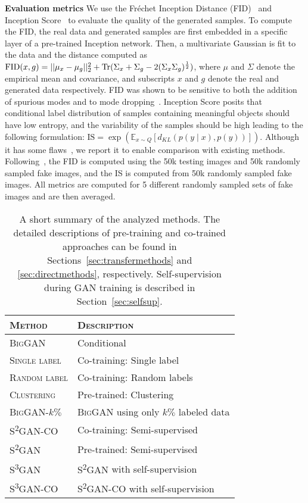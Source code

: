 \documentclass{article}
\newcommand{\E}{\mathbb{E}}
\DeclareMathOperator{\Tr}{Tr}
\newcommand{\cotrainSS}{\textsc{S\textsuperscript{2}GAN-CO}}
\newcommand{\cotrainSSS}{\textsc{S\textsuperscript{3}GAN-CO}}
\newcommand{\tranSS}{\textsc{S\textsuperscript{2}GAN}}
\newcommand{\tranSSS}{\textsc{S\textsuperscript{3}GAN}}
\newcommand{\tranC}{\textsc{Clustering}}
\newcommand{\slabels}{\textsc{Single label}}
\newcommand{\rlabels}{\textsc{Random label}}
\newcommand{\biggan}{\textsc{BigGAN}}
\begin{document}
\textbf{Evaluation metrics} \quad
We use the Fr{\'e}chet Inception Distance (FID)~\citep{heusel2017gans} and Inception Score~\citep{salimans2016improved} to evaluate the quality of the generated samples. To compute the FID, the real data and generated samples are first embedded in a specific layer of a pre-trained Inception network. Then, a multivariate Gaussian is fit to the data and the distance computed as
$\FID(x, g) = ||\mu_x -\mu_g||_2^2 + \Tr(\Sigma_x + \Sigma_g - 2(\Sigma_x\Sigma_g)^\frac12)$,
where $\mu$ and $\Sigma$ denote the empirical mean and covariance, and subscripts $x$ and $g$ denote the real and generated data respectively. FID was shown to be sensitive to both the addition of spurious modes and to mode dropping~\citep{sajjadi2018assessing,lucic2018}. Inception Score posits that conditional label distribution of samples containing meaningful objects should have low entropy, and the variability of the samples should be
high leading to the following formulation: $\text{IS} = \exp(\E_{x \sim Q}[d_{KL}(p(y
\mid x), p(y))])$. Although it has some flaws~\citep{barratt2018note}, we report it to enable comparison with existing methods. Following~\citet{brock2018large}, the FID is computed using the 50k \imagenet{} testing images and 50k randomly sampled fake images, and the IS is computed from 50k randomly sampled fake images. All metrics are computed for 5 different randomly sampled sets of fake images and are then averaged.

\begin{table}[t]
  \centering
  \caption{A short summary of the analyzed methods. The detailed descriptions of pre-training and co-trained approaches can be found in Sections~\ref{sec:transfermethods} and \ref{sec:directmethods}, respectively. Self-supervision during GAN training is described in Section~\ref{sec:selfsup}.\vspace{0.2cm}}
\begin{tabular}{ll}
\toprule
  \textsc{Method} & \textsc{Description} \\\midrule
  \biggan         & Conditional \citep{brock2018large} \\\midrule
  \slabels        & Co-training: Single label\\
  \rlabels        & Co-training: Random labels\\
  \tranC{}        & Pre-trained: Clustering\\\midrule
  \biggan-$k\%$    & \biggan{} using only $k\%$ labeled data \\
  \cotrainSS{}    & Co-training: Semi-supervised\\
  \tranSS{}       & Pre-trained: Semi-supervised\\\midrule
  \tranSSS{}      & \tranSS{} with self-supervision\\
  \cotrainSSS{}   & \cotrainSS{} with self-supervision\\
  \bottomrule
\end{tabular}
\label{tab:methods}
\end{table}
\end{document}
